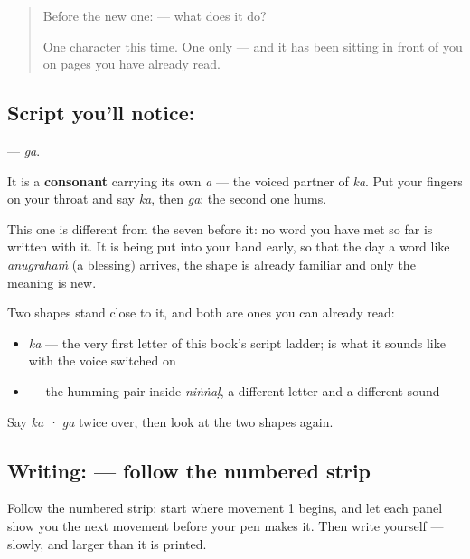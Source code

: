 \label{lesson:ML-S132-letter-ga}



\begin{quote}
Before the new one:  — what does it do?

One character this time. One only — and it has been sitting in front of you on pages you have already read.
\end{quote}

\subsection*{Script you'll notice: }
\textbf{} — \emph{ga}.

It is a \textbf{consonant} carrying its own \emph{a} — the voiced partner of \textbf{} \emph{ka}. Put your fingers on your throat and say \emph{ka}, then \emph{ga}: the second one hums.

This one is different from the seven before it: no word you have met so far is written with it. It is being put into your hand early, so that the day a word like \emph{anugrahaṁ} (a blessing) arrives, the shape is already familiar and only the meaning is new.

Two shapes stand close to it, and both are ones you can already read:

\begin{itemize}
\raggedright
  \item \textbf{} \emph{ka} — the very first letter of this book's script ladder; \textbf{} is what it sounds like with the voice switched on
  \item \textbf{} — the humming pair inside \textbf{} \emph{niṅṅaḷ}, a different letter and a different sound
\end{itemize}

Say \emph{ka · ga} twice over, then look at the two shapes again.

\subsection*{Writing:  — follow the numbered strip}

Follow the numbered strip: start where movement 1 begins, and let each panel show you the next movement before your pen makes it. Then write  yourself — slowly, and larger than it is printed.

